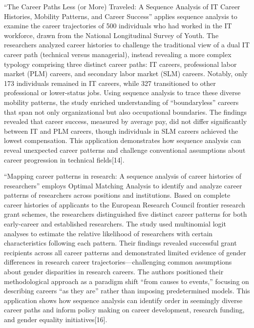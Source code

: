 \documentclass[
  letterpaper,
  DIV=11,
  numbers=noendperiod]{scrartcl}
\begin{document}
``The Career Paths Less (or More) Traveled: A Sequence Analysis of IT
Career Histories, Mobility Patterns, and Career Success'' applies
sequence analysis to examine the career trajectories of 500 individuals
who had worked in the IT workforce, drawn from the National Longitudinal
Survey of Youth. The researchers analyzed career histories to challenge
the traditional view of a dual IT career path (technical versus
managerial), instead revealing a more complex typology comprising three
distinct career paths: IT careers, professional labor market (PLM)
careers, and secondary labor market (SLM) careers. Notably, only 173
individuals remained in IT careers, while 327 transitioned to other
professional or lower-status jobs. Using sequence analysis to trace
these diverse mobility patterns, the study enriched understanding of
``boundaryless'' careers that span not only organizational but also
occupational boundaries. The findings revealed that career success,
measured by average pay, did not differ significantly between IT and PLM
careers, though individuals in SLM careers achieved the lowest
compensation. This application demonstrates how sequence analysis can
reveal unexpected career patterns and challenge conventional assumptions
about career progression in technical fields{[}14{]}.

``Mapping career patterns in research: A sequence analysis of career
histories of researchers'' employs Optimal Matching Analysis to identify
and analyze career patterns of researchers across positions and
institutions. Based on complete career histories of applicants to the
European Research Council frontier research grant schemes, the
researchers distinguished five distinct career patterns for both
early-career and established researchers. The study used multinomial
logit analyses to estimate the relative likelihood of researchers with
certain characteristics following each pattern. Their findings revealed
successful grant recipients across all career patterns and demonstrated
limited evidence of gender differences in research career
trajectories---challenging common assumptions about gender disparities
in research careers. The authors positioned their methodological
approach as a paradigm shift ``from causes to events,'' focusing on
describing careers ``as they are'' rather than imposing predetermined
models. This application shows how sequence analysis can identify order
in seemingly diverse career paths and inform policy making on career
development, research funding, and gender equality initiatives{[}16{]}.
\end{document}
